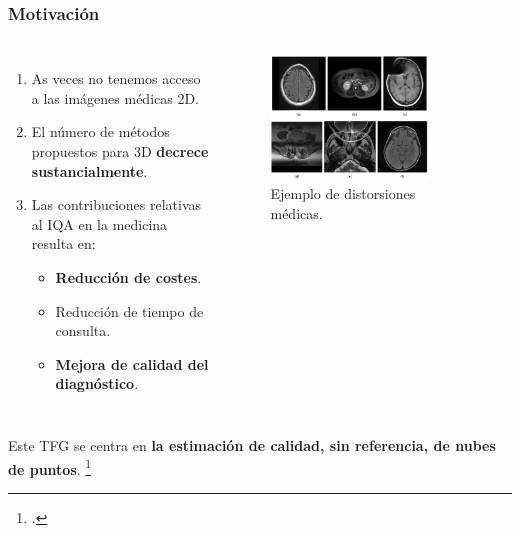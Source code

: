 \begin{frame}
  \frametitle{Motivación}
  \vspace{-0.2cm}
  \begin{columns}
  \begin{enumerate}
    \item As veces no tenemos acceso a las imágenes médicas 2D.
    \item El número de métodos propuestos para 3D \textbf{decrece sustancialmente}.
    \item Las contribuciones relativas al IQA en la medicina resulta en: 
      \begin{itemize}
        \item \textbf{Reducción de costes}. 
        \item Reducción de tiempo de consulta.
        \item \textbf{Mejora de calidad del diagnóstico}.
      \end{itemize}
  \end{enumerate}
  \begin{figure}
    \begin{center}
      \includegraphics[width=0.78\textwidth]{imagenes/chapter1/MedicalDistortions}
    \end{center}
    \caption{Ejemplo de distorsiones médicas\footnotemark.}
  \end{figure}
  \end{columns}
  Este TFG se centra en \textbf{la estimación de calidad, sin referencia, de nubes de puntos}. 
  \footcitetext{MoreMedicalDistortion}
\end{frame}

